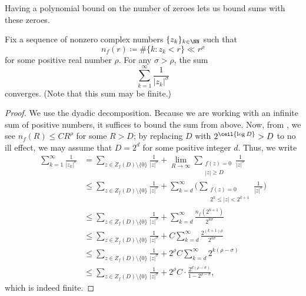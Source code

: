 \documentclass[notes.tex]{subfiles}
\begin{document}
Having a polynomial bound on the number of zeroes lets us bound sums with these zeroes.
\begin{corollary} \label{cor:bound-sum-of-zeroes}
	Fix a sequence of nonzero complex numbers $\{z_k\}_{k\in\NN}$ such that
	\[n_f(r)\coloneqq\#\{k:z_k<r\}\ll r^\rho\]
	for some positive real number $\rho$. For any $\sigma>\rho$, the sum
	\[\sum_{k=1}^\infty\frac1{|z_k|^\sigma}\]
	converges. (Note that this sum may be finite.)
\end{corollary}
\begin{proof}
	We use the dyadic decomposition. Because we are working with an infinite sum of positive numbers, it suffices to bound the sum from above. Now, from , we see $n_f(R)\le CR^\rho$ for some $R>D$; by replacing $D$ with $2^{\ceil{\log D}}>D$ to no ill effect, we may assume that $D=2^d$ for some positive integer $d$. Thus, we write
	\begin{align*}
		\sum_{k=1}^\infty\frac1{|z_k|^\sigma} &= \sum_{z\in Z_f(D)\setminus\{0\}}\frac1{|z|^\sigma}+\lim_{R\to\infty}\sum_{\substack{f(z)=0\\|z|\ge D}}\frac1{|z|^\sigma} \\
		&\le \sum_{z\in Z_f(D)\setminus\{0\}}\frac1{|z|^\sigma}+\sum_{k=d}^\infty\Bigg(\sum_{\substack{f(z)=0\\2^k\le|z|<2^{k+1}}}\frac1{|z|^\sigma}\Bigg) \\
		&\le \sum_{z\in Z_f(D)\setminus\{0\}}\frac1{|z|^\sigma}+\sum_{k=d}^\infty\frac{n_f\left(2^{k+1}\right)}{2^{k\sigma}} \\
		&\le \sum_{z\in Z_f(D)\setminus\{0\}}\frac1{|z|^\sigma}+C\sum_{k=d}^\infty\frac{2^{(k+1)\rho}}{2^{k\sigma}} \\
		&\le \sum_{z\in Z_f(D)\setminus\{0\}}\frac1{|z|^\sigma}+2^\rho C\sum_{k=d}^\infty2^{k(\rho-\sigma)} \\
		&\le \sum_{z\in Z_f(D)\setminus\{0\}}\frac1{|z|^\sigma}+2^\rho C\cdot\frac{2^{d(\rho-\sigma)}}{1-2^{\rho-\sigma}},
	\end{align*}
	which is indeed finite.
\end{proof}
\end{document}
